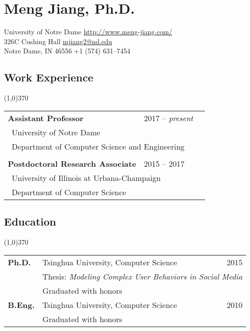 \documentclass[10pt]{article}
\begin{document}
\setcounter{secnumdepth}{0}

\thispagestyle{firststyle}

\section{\LARGE{\sc Meng Jiang, Ph.D.}}
University of Notre Dame \hfill \url{http://www.meng-jiang.com/} \\
326C Cushing Hall \hfill \url{mjiang2@nd.edu}\\
Notre Dame, IN 46556 \hfill +1 (574) 631--7454

\subsection{\sc Work Experience}
\vspace{-0.4cm} \line(1,0){370} \vspace{0.1cm}

\begin{table}[h!]
\begin{tabular*}{12.7cm}{p{10.0cm}p{3.25cm}r}
\bf{Assistant Professor}&2017 -- \textit{present}\\
 \multicolumn{2}{l}{~{University of Notre Dame}}\\
 \multicolumn{2}{l}{~{Department of Computer Science and Engineering}}\\
\\
\bf{Postdoctoral Research Associate}&2015 -- 2017\\
 \multicolumn{2}{l}{~{University of Illinois at Urbana-Champaign}}\\
 \multicolumn{2}{l}{~{Department of Computer Science}}
\end{tabular*}
\end{table}
\vspace{-0.4cm}

\vspace{-0.2cm}
\subsection{\sc Education}
\vspace{-0.4cm} \line(1,0){370} \vspace{-0.1cm}

\begin{table}[h!]
\begin{tabular*}{12.7cm}{p{1.15cm}p{10.00cm}r}
\bf{Ph.D.}&Tsinghua University, Computer Science&2015\\
 &\multicolumn{2}{l}{\small Thesis: \textit{Modeling Complex User Behaviors in Social Media}}\\
 &\multicolumn{2}{l}{\small Graduated with honors}\\	
\bf{B.Eng.}&Tsinghua University, Computer Science&2010\\
 &\multicolumn{2}{l}{\small Graduated with honors}\\	

\end{tabular*}
\end{table}
\end{document}
